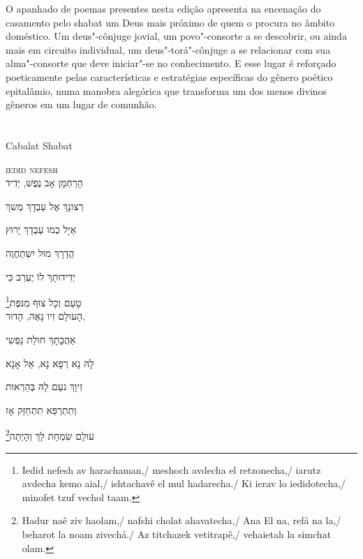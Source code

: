 O apanhado de poemas presentes nesta edição apresenta na encenação do
casamento pelo shabat um Deus mais próximo de quem o procura no âmbito
doméstico. Um deus"-cônjuge jovial, um povo"-consorte a se descobrir, ou
ainda mais em circuito individual, um deus"-torá"-cônjuge a se relacionar
com sua alma"-consorte que deve iniciar"-se no conhecimento. E esse lugar
é reforçado poeticamente pelas características e estratégias específicas
do gênero poético epitalâmio, numa manobra alegórica que transforma um
dos menos divinos gêneros em um lugar de comunhão.



\chapter*{}
\begin{center}
\begin{vplace}[0.3]
\Large
Cabalat Shabat
\end{vplace}
\end{center}
\thispagestyle{empty}


\movetoevenpage
\raggedleft


\textsc{iedid nefesh}\\[15pt]

הָרַחְמָן אָב נֶפֶשׁ, יְדִיד 

רְצונָךְ אֶל עַבְדָךְ מְשךְ 

אַיָל כְמו עַבְדָךְ יָרוּץ 

הֲדָרָךְ מוּל יִשְתַחֲוֶה 

יְדִידוּתָךְ לוֹ יֶעְרַב כִּי 

\footnote{Iedid nefesh av harachaman,/ meshoch avdecha el retzonecha,/ iarutz avdecha kemo aial,/ ishtachavê el mul hadarecha./ Ki ierav lo iedidotecha,/ minofet tzuf vechol taam.}טָעַם וְכָל צוּף מִנּפֶת\\[10pt]

הָעולָם זִיו נָאֶה, הָדוּר,

אַהֲבָתָךְ חולַת נַפְשִי 

לָהּ נָא רְפָא נָא, אֵל אָנָא 

זִיוָךְ נעַם לָהּ בְּהַרְאות

וְתִתְרַפֵּא תִתְחֵזֵּק אָז

\footnote{Hadur naê ziv haolam,/ nafshi cholat ahavatecha,/ Ana El na, refá na la,/ beharot la noam zivechá./ Az titchazek vetitrapê,/ vehaietah la simchat olam.}עולָם שִׂמְחַת לָךְ וְהָיְתָה\\[10pt]


